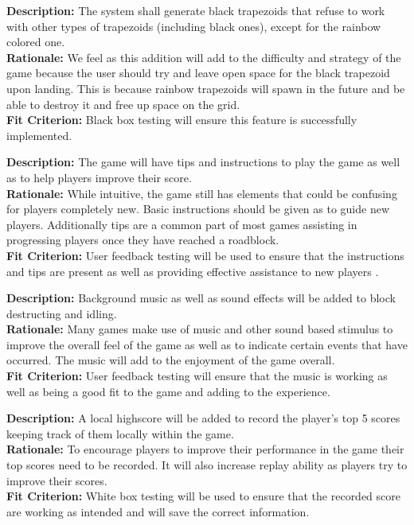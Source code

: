 \documentclass[12pt, titlepage]{article}
\begin{document}
\begin{enumerate}[label=F\arabic*]
{\item \textbf{Description:} The system shall generate black trapezoids that refuse to work with other types of trapezoids (including black ones), except for the rainbow colored one.\\
\textbf{Rationale:} We feel as this addition will add to the difficulty and strategy of the game because the user should try and leave open space for the black trapezoid upon landing. This is because rainbow trapezoids will spawn in the future and be able to destroy it and free up space on the grid.\\
\textbf{Fit Criterion:}  Black box testing will ensure this feature is successfully implemented.


\item \textbf{Description:} The game will have tips and instructions to play the game as well as to help players improve their score. \\
\textbf{Rationale:} While intuitive, the game still has elements that could be confusing for players completely new. Basic instructions should be given as to guide new players. Additionally tips  are a common part of most games assisting in progressing players once they have reached a roadblock. \\
\textbf{Fit Criterion:} User feedback testing will be used to ensure that the instructions and tips are present as well as providing effective assistance to new players .

\item \textbf{Description:} Background music as well as sound effects will be added to block destructing and idling.\\
\textbf{Rationale:} Many games make use of music and other sound based stimulus to improve the overall feel of the game as well as to indicate certain events that have occurred. The music will add to the enjoyment of the game overall.\\
\textbf{Fit Criterion:}  User feedback testing will ensure that the music is working as well as being a good fit to the game and adding to the experience.

\item \textbf{Description:} A local highscore will be added to record the player's top 5 scores keeping track of them locally within the game.\\
\textbf{Rationale:} To encourage players to improve their performance in the game their top scores need to be recorded. It will also increase replay ability as players try to improve their scores.\\
\textbf{Fit Criterion:} White box testing will be used to ensure that the recorded score are working as intended and will save the correct information.

}
\end{enumerate}
\end{document}
